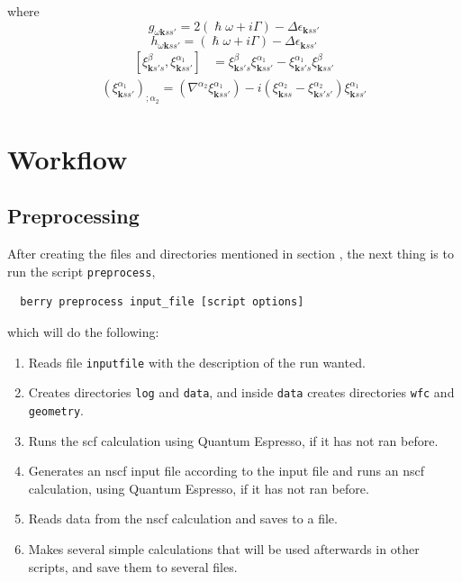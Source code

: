 \documentclass[a4paper,12pt]{report}
\begin{document}
where
\begin{equation}
 g_{\omega\pmb{k}ss'} = 2(\hslash\omega + i\Gamma) - \Delta\epsilon_{\pmb{k}ss'}
\end{equation}
\begin{equation}
 h_{\omega\pmb{k}ss'} = (\hslash\omega + i\Gamma) - \Delta\epsilon_{\pmb{k}ss'}
\end{equation}
\begin{align}
  \left[ \xi_{\pmb{k}s's}^{\beta},\xi_{\pmb{k}ss'}^{\alpha_1}\right] &=
  \xi_{\pmb{k}s's}^{\beta}\xi_{\pmb{k}ss'}^{\alpha_1} - \xi_{\pmb{k}s's}^{\alpha_1}\xi_{\pmb{k}ss'}^{\beta}
\end{align}
\begin{align}
 (\xi_{\pmb{k}ss'}^{\alpha_1})_{;\alpha_2}=
  \left( \nabla^{\alpha_2} \xi_{\pmb{k}ss'}^{\alpha_1}  \right) - i\left( \xi_{\pmb{k}ss}^{\alpha_2} - \xi_{\pmb{k}s's'}^{\alpha_2}\right) \xi_{\pmb{k}ss'}^{\alpha_1}
\end{align}







\chapter{Workflow}\label{ch:workflow}



\section{Preprocessing}\label{sec:preprocessing}
 After creating the files and directories mentioned in section , the next thing is
 to run the script \texttt{preprocess},
 \begin{verbatim}
  berry preprocess input_file [script options]
 \end{verbatim}
 which will do the following:
 \begin{enumerate}
  \item Reads file \texttt{inputfile} with the description of the run wanted.
  \item Creates directories \verb|log| and \verb|data|, and inside \verb|data|
  creates directories \verb|wfc| and \verb|geometry|.
  \item Runs the scf calculation using {\sc Quantum Espresso}, if it has not ran before.
  \item Generates an nscf input file according to the input file and runs an nscf calculation,
  using {\sc Quantum Espresso}, if it has not ran before.
  \item Reads data from the nscf calculation and saves to a file.
  \item Makes several simple calculations that will be used afterwards in other scripts,
  and save them to several files.
 \end{enumerate}
\end{document}
